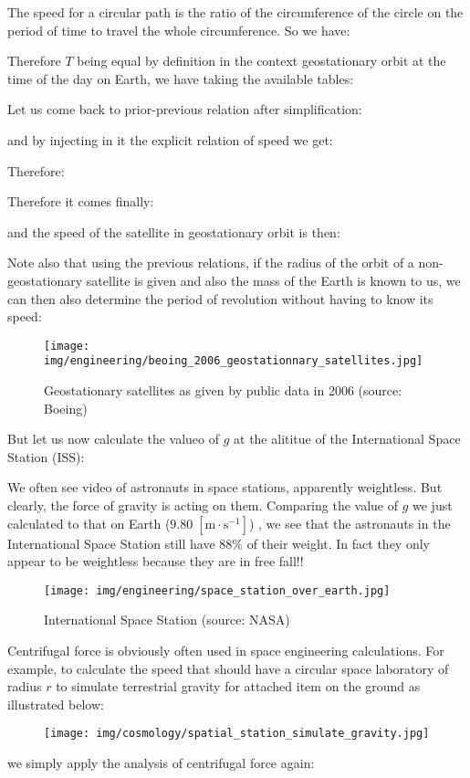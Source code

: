 	The speed for a circular path is the ratio of the circumference of the circle on the period of time to travel the whole circumference. So we have:
	
	Therefore $T$ being equal by definition in the context geostationary orbit at the time of the day on Earth, we have taking the available tables:
	
	Let us come back to prior-previous relation after simplification:
	
	and by injecting in it the explicit relation of speed we get:
	
	Therefore:
	
	Therefore it comes finally:
	
	and the speed of the satellite in geostationary orbit is then:
	
	Note also that using the previous relations, if the radius of the orbit of a non-geostationary satellite is given and also the mass of the Earth is known to us, we can then also determine the period of revolution without having to know its speed:
	
	\begin{figure}[H]
		\centering
		\texttt{[image: img/engineering/beoing\_2006\_geostationnary\_satellites.jpg]}
		\caption{Geostationary satellites as given by public data in 2006 (source: Boeing)}
	\end{figure}
	But let us now calculate the valueo of $g$ at the alititue of the International Space Station (ISS):
	
	We often see video of astronauts in space stations, apparently weightless. But clearly, the force of gravity is acting
on them. Comparing the value of $g$ we just calculated to that on Earth ($9.80\;[\text{m}\cdot \text{s}^{-1}]$) , we see that the astronauts in the International Space Station still have $88\%$ of their weight. In fact they only appear to be weightless because they are in free fall!!
	\begin{figure}[H]
		\centering
		\texttt{[image: img/engineering/space\_station\_over\_earth.jpg]}
		\caption{International Space Station (source: NASA)}
	\end{figure}
	Centrifugal force is obviously often used in space engineering calculations. For example, to calculate the speed that should have a circular space laboratory of radius $r$ to simulate terrestrial gravity for attached item on the ground as illustrated below:
	\begin{figure}[H]
		\centering
		\texttt{[image: img/cosmology/spatial\_station\_simulate\_gravity.jpg]}
	\end{figure}
	we simply apply the analysis of centrifugal force again:
	
